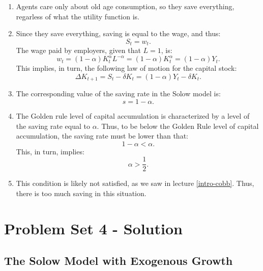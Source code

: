 \documentclass[]{book}
\begin{document}
\begin{enumerate}
\def\labelenumi{\arabic{enumi}.}
\item
  Agents care only about old age consumption, so they save everything,
  regarless of what the utility function is.
\item
  Since they save everything, saving is equal to the wage, and thus:
  \[S_t = w_t.\] The wage paid by employers, given that \(L=1\), is:
  \[w_{t}=(1-\alpha)K_{t}^{\alpha}L^{-\alpha}=(1-\alpha)K_{t}^{\alpha} = (1-\alpha)Y_t.\]
  This implies, in turn, the following law of motion for the capital
  stock:
  \[\Delta K_{t+1} = S_t - \delta K_t = (1-\alpha)Y_t-\delta K_t.\]
\item
  The corresponding value of the saving rate in the Solow model is:
  \[s = 1-\alpha.\]
\item
  The Golden rule level of capital accumulation is characterized by a
  level of the saving rate equal to \(\alpha\). Thus, to be below the
  Golden Rule level of capital accumulation, the saving rate must be
  lower than that: \[1-\alpha < \alpha.\] This, in turn, implies:
  \[\alpha > \frac{1}{2}.\]
\item
  This condition is likely not satisfied, as we saw in lecture
  \ref{intro-cobb}. Thus, there is too much saving in this situation.
\end{enumerate}

\hypertarget{pset4-sol}{\chapter{Problem Set 4 -
Solution}\label{pset4-sol}}

\section{The Solow Model with Exogenous
Growth}\label{the-solow-model-with-exogenous-growth}
\end{document}
